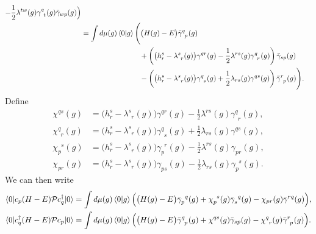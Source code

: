 \documentclass[11pt,letterpaper]{article}
\begin{document}
\begin{subequations}
\begin{align}
    - \frac{1}{2} \lambda^{tw}(g)
    \gamma^{q\phantom{t}}_{\phantom{q}t}(g)
    \bar{\gamma}_{wp}(g)
  \Bigr)\\
  \nonumber
  &= \int d\mu(g) \braket{0|g}
  \Biggl(
    \big(H(g) - E\big) \bar{\gamma}_{\phantom{q}p}^{q\phantom{p}}(g)\\
    \nonumber
    &\hspace{8em}
    + \left(
      \big(h_r^s - \lambda^{s\phantom{r}}_{\phantom{s}r}(g)\big)
      \gamma^{qr}(g)
      - \frac{1}{2} \lambda^{rs}(g) \gamma^{q\phantom{r}}_{\phantom{q}r}(g)
    \right)
    \bar{\gamma}_{sp}(g)\\
    &\hspace{8em}
    - \left(
      \big(h_r^s - \lambda^{s\phantom{r}}_{\phantom{s}r}(g)\big)
      \gamma_{\phantom{q}s}^{q\phantom{s}}(g)
      + \frac{1}{2} \lambda_{rs}(g) \gamma^{qs}(g)
    \right)
    \bar{\gamma}^{r\phantom{p}}_{\phantom{r}p}(g)
  \Biggr).
\end{align}
\end{subequations}
Define
\begin{align}
  \chi^{qs}(g)
  &= \big(h_r^s - \lambda^{s\phantom{r}}_{\phantom{s}r}(g)\big)
  \gamma^{qr}(g)
  - \frac{1}{2} \lambda^{rs}(g) \gamma^{q\phantom{r}}_{\phantom{q}r}(g),\\
  \chi^{q\phantom{r}}_{\phantom{q}r}(g)
  &= \big(h_r^s - \lambda^{s\phantom{r}}_{\phantom{s}r}(g)\big)
  \gamma_{\phantom{q}s}^{q\phantom{r}}(g)
  + \frac{1}{2} \lambda_{rs}(g) \gamma^{qs}(g),\\
  \chi_{p\phantom{s}}^{\phantom{p}s}(g)
  &= \big(h_r^s - \lambda^{s\phantom{r}}_{\phantom{s}r}(g)\big)
  \gamma_{p\phantom{r}}^{\phantom{p}r}(g)
  - \frac{1}{2} \lambda^{rs}(g) \gamma_{pr}(g),\\
  \chi_{pr}(g)
  &= \big(h_r^s - \lambda^{s\phantom{r}}_{\phantom{s}r}(g)\big)
  \gamma_{ps}(g)
  - \frac{1}{2} \lambda_{rs}(g) \gamma_{p\phantom{s}}^{\phantom{p}s}(g).
\end{align}
We can then write
\begin{subequations}
\begin{align}
  \braket{0|c_p (H - E) \mathcal{P} c^\dag_q|0}
  &= \int d\mu(g) \braket{0|g}
  \Big(
    \big(H(g) - E\big) \bar{\gamma}_{p\phantom{q}}^{\phantom{p}q}(g)
    + \chi_{p\phantom{s}}^{\phantom{p}s}(g) \bar{\gamma}_{s\phantom{q}}^{\phantom{s}q}(g)
    - \chi_{pr}(g) \bar{\gamma}^{rq}(g)
  \Big),\\
  \braket{0|c^\dag_q (H - E) \mathcal{P} c_p|0}
  &= \int d\mu(g) \braket{0|g}
  \Big(
    \big(H(g) - E\big) \bar{\gamma}_{\phantom{q}p}^{q\phantom{p}}(g)
    + \chi^{qs}(g) \bar{\gamma}_{sp}(g)
    - \chi^{q\phantom{r}}_{\phantom{q}r}(g) \bar{\gamma}^{r\phantom{p}}_{\phantom{r}p}(g) 
  \Big).
\end{align}
\end{subequations}
\end{document}
